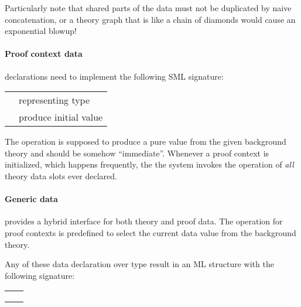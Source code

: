 \begin{isabellebody}
\begin{isamarkuptext}
  Particularly note that shared parts of the data must not be
  duplicated by naive concatenation, or a theory graph that is like a
  chain of diamonds would cause an exponential blowup!

  \paragraph{Proof context data} declarations need to implement the
  following SML signature:

  \medskip
  \begin{tabular}{ll}
  \isa{{\isasymtype}\ T} & representing type \\
  \isa{{\isasymval}\ init{\isacharcolon}\ theory\ {\isasymrightarrow}\ T} & produce initial value \\
  \end{tabular}
  \medskip

  \noindent The  operation is supposed to produce a pure
  value from the given background theory and should be somehow
  ``immediate''.  Whenever a proof context is initialized, which
  happens frequently, the the system invokes the 
  operation of \emph{all} theory data slots ever declared.

  \paragraph{Generic data} provides a hybrid interface for both theory
  and proof data.  The  operation for proof contexts is
  predefined to select the current data value from the background
  theory.

  \bigskip Any of these data declaration over type  result
  in an ML structure with the following signature:

  \medskip
  \begin{tabular}{ll}
  \isa{get{\isacharcolon}\ context\ {\isasymrightarrow}\ T} \\
  \isa{put{\isacharcolon}\ T\ {\isasymrightarrow}\ context\ {\isasymrightarrow}\ context} \\
  \isa{map{\isacharcolon}\ {\isacharparenleft}T\ {\isasymrightarrow}\ T{\isacharparenright}\ {\isasymrightarrow}\ context\ {\isasymrightarrow}\ context} \\
  \end{tabular}
  \medskip


\end{isamarkuptext}
\end{isabellebody}
